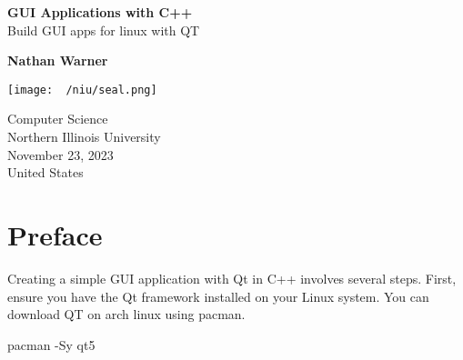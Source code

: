 \documentclass{report}
\title{\Huge{}}
\author{\huge{Nathan Warner}}
\date{\huge{}}
\begin{document}
        \begin{titlepage}
       \begin{center}
           \vspace*{1cm}
    
           \textbf{GUI Applications with C++} \\
           Build GUI apps for linux with QT
    
           \vspace{0.5cm}
            
                
           \vspace{1.5cm}
    
           \textbf{Nathan Warner}
    
           \vfill
                
                
           \vspace{0.8cm}
         
           \texttt{[image: ~/niu/seal.png]}
                
           Computer Science \\
           Northern Illinois University\\
           November 23, 2023\\
           United States\\
           
                
       \end{center}
    \end{titlepage}
    \tableofcontents
    \pagebreak \bigbreak \noindent
    \section*{\LARGE Preface}
    \bigbreak \noindent 
    Creating a simple GUI application with Qt in C++ involves several steps. First, ensure you have the Qt framework installed on your Linux system. You can download QT on arch linux using pacman.
    \bigbreak \noindent 
    \begin{bashcode}
pacman -Sy qt5
    \end{bashcode}

    \pagebreak 
\end{document}
